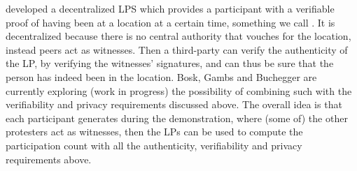 
\textcite{PROPS} developed a decentralized \ac{LPS} which provides 
a participant with a verifiable proof of having been at a location at a certain 
time, something we call .
It is decentralized because there is no central authority that vouches for the 
location, instead peers act as witnesses.
Then a third-party can verify the authenticity of the \ac{LP}, by verifying the 
witnesses' signatures, and can thus be sure that the person has indeed been in 
the location.
Bosk, Gambs and Buchegger are currently exploring (work in progress) the 
possibility of combining such  with the verifiability and privacy 
requirements discussed above.
The overall idea is that each participant generates  during the 
demonstration, where (some of) the other protesters act as witnesses, then the 
\acp{LP} can be used to compute the participation count with all the 
authenticity, verifiability and privacy requirements above.
